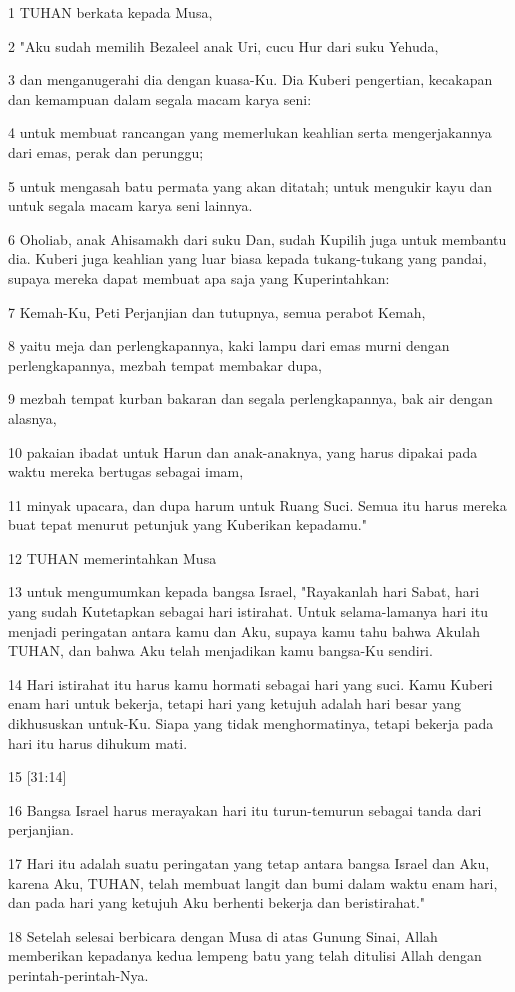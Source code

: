 \par 1 TUHAN berkata kepada Musa,
\par 2 "Aku sudah memilih Bezaleel anak Uri, cucu Hur dari suku Yehuda,
\par 3 dan menganugerahi dia dengan kuasa-Ku. Dia Kuberi pengertian, kecakapan dan kemampuan dalam segala macam karya seni:
\par 4 untuk membuat rancangan yang memerlukan keahlian serta mengerjakannya dari emas, perak dan perunggu;
\par 5 untuk mengasah batu permata yang akan ditatah; untuk mengukir kayu dan untuk segala macam karya seni lainnya.
\par 6 Oholiab, anak Ahisamakh dari suku Dan, sudah Kupilih juga untuk membantu dia. Kuberi juga keahlian yang luar biasa kepada tukang-tukang yang pandai, supaya mereka dapat membuat apa saja yang Kuperintahkan:
\par 7 Kemah-Ku, Peti Perjanjian dan tutupnya, semua perabot Kemah,
\par 8 yaitu meja dan perlengkapannya, kaki lampu dari emas murni dengan perlengkapannya, mezbah tempat membakar dupa,
\par 9 mezbah tempat kurban bakaran dan segala perlengkapannya, bak air dengan alasnya,
\par 10 pakaian ibadat untuk Harun dan anak-anaknya, yang harus dipakai pada waktu mereka bertugas sebagai imam,
\par 11 minyak upacara, dan dupa harum untuk Ruang Suci. Semua itu harus mereka buat tepat menurut petunjuk yang Kuberikan kepadamu."
\par 12 TUHAN memerintahkan Musa
\par 13 untuk mengumumkan kepada bangsa Israel, "Rayakanlah hari Sabat, hari yang sudah Kutetapkan sebagai hari istirahat. Untuk selama-lamanya hari itu menjadi peringatan antara kamu dan Aku, supaya kamu tahu bahwa Akulah TUHAN, dan bahwa Aku telah menjadikan kamu bangsa-Ku sendiri.
\par 14 Hari istirahat itu harus kamu hormati sebagai hari yang suci. Kamu Kuberi enam hari untuk bekerja, tetapi hari yang ketujuh adalah hari besar yang dikhususkan untuk-Ku. Siapa yang tidak menghormatinya, tetapi bekerja pada hari itu harus dihukum mati.
\par 15 [31:14]
\par 16 Bangsa Israel harus merayakan hari itu turun-temurun sebagai tanda dari perjanjian.
\par 17 Hari itu adalah suatu peringatan yang tetap antara bangsa Israel dan Aku, karena Aku, TUHAN, telah membuat langit dan bumi dalam waktu enam hari, dan pada hari yang ketujuh Aku berhenti bekerja dan beristirahat."
\par 18 Setelah selesai berbicara dengan Musa di atas Gunung Sinai, Allah memberikan kepadanya kedua lempeng batu yang telah ditulisi Allah dengan perintah-perintah-Nya.

